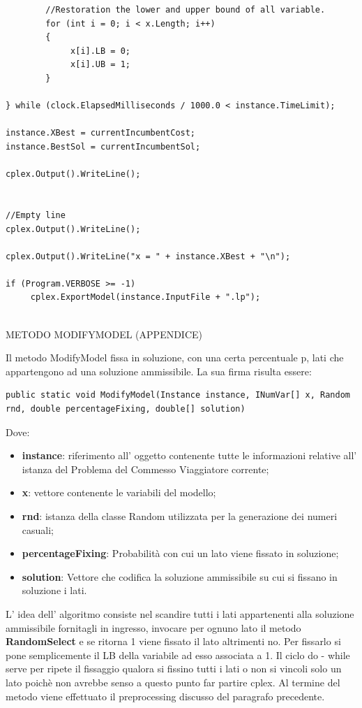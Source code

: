 \documentclass[11pt]{article}
\begin{document}
\begin{lstlisting}
        //Restoration the lower and upper bound of all variable. 
        for (int i = 0; i < x.Length; i++)
        {
             x[i].LB = 0;
             x[i].UB = 1;
        }

} while (clock.ElapsedMilliseconds / 1000.0 < instance.TimeLimit);

instance.XBest = currentIncumbentCost;
instance.BestSol = currentIncumbentSol;

cplex.Output().WriteLine();


//Empty line
cplex.Output().WriteLine();

cplex.Output().WriteLine("x = " + instance.XBest + "\n");

if (Program.VERBOSE >= -1)
     cplex.ExportModel(instance.InputFile + ".lp");


\end{lstlisting}



\vspace{2\baselineskip}
METODO MODIFYMODEL (APPENDICE)
\vspace{2\baselineskip} 

Il metodo ModifyModel fissa in soluzione, con una certa percentuale p, lati che appartengono ad una soluzione ammissibile. La sua firma risulta essere:

\begin{lstlisting} 
public static void ModifyModel(Instance instance, INumVar[] x, Random rnd, double percentageFixing, double[] solution)
\end{lstlisting}

Dove:

\begin{itemize}
    \item \textbf{instance}: riferimento all' oggetto contenente tutte le informazioni relative all' istanza del Problema del Commesso Viaggiatore corrente;
    \item \textbf{x}: vettore contenente le variabili del modello;
    \item \textbf{rnd}: istanza della classe Random utilizzata per la generazione dei numeri casuali;
    \item \textbf{percentageFixing}: Probabilità con cui un lato viene fissato in soluzione;
    \item \textbf{solution}: Vettore che codifica la soluzione ammissibile su cui si fissano in soluzione i lati.
\end{itemize}


L' idea dell' algoritmo consiste nel scandire tutti i lati appartenenti alla soluzione ammissibile fornitagli in ingresso, invocare per ognuno lato il metodo \textbf{RandomSelect} e se ritorna 1 viene fissato il lato altrimenti no. Per fissarlo si pone semplicemente il LB della variabile ad esso associata a 1.  Il ciclo do - while serve per ripete il fissaggio qualora si fissino tutti i lati o non si vincoli solo un lato poichè non avrebbe senso a questo punto far partire cplex. Al termine del metodo viene effettuato il preprocessing discusso del paragrafo precedente.
\end{document}
